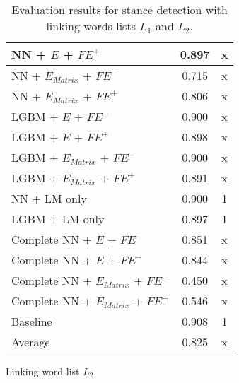 \begin{table}[h]
\begin{subtable}{.5\textwidth}
\begin{tabular}{|| l || c | c ||}
 			\hline
 			NN + $E$ + $\textit{FE}^+$ & 0.897 & x \\
 			\hline
 			NN + $E_{Matrix}$ + $\textit{FE}^-$ & 0.715 & x \\
 			\hline
 			NN + $E_{Matrix}$ + $\textit{FE}^+$ & 0.806 & x \\
 			\hline
 			LGBM + $E$ + $\textit{FE}^-$ & 0.900 & x \\
 			\hline
 			LGBM + $E$ + $\textit{FE}^+$ & 0.898 & x \\
 			\hline
 			LGBM + $E_{Matrix}$ + $\textit{FE}^-$ & 0.900 & x \\
 			\hline
 			LGBM + $E_{Matrix}$ + $\textit{FE}^+$ & 0.891 & x \\
 			\hline
 			NN + LM only & 0.900 & 1 \\
 			\hline
 			LGBM + LM only & 0.897 & 1 \\
 			\hline
 			Complete NN + $E$ + $\textit{FE}^-$ & 0.851 & x \\
 			\hline
 			Complete NN + $E$ + $\textit{FE}^+$ & 0.844 & x \\
 			\hline
 			Complete NN + $E_{Matrix}$ + $\textit{FE}^-$ & 0.450 & x \\
 			\hline
 			Complete NN + $E_{Matrix}$ + $\textit{FE}^+$ & 0.546 & x \\
 			\hline
 			Baseline & 0.908 & 1\\
 			\hline
 			\hline
 			Average & 0.825 & x \\
 			\hline
		\end{tabular}
		\renewcommand{\arraystretch}{1}
  		\caption{Linking word list $L_2$.}%
  	\end{subtable}
  	\caption{Evaluation results for stance detection with linking words lists $L_1$ and $L_2$.}%
  	\label{fig:stanceresults}
\end{table}

